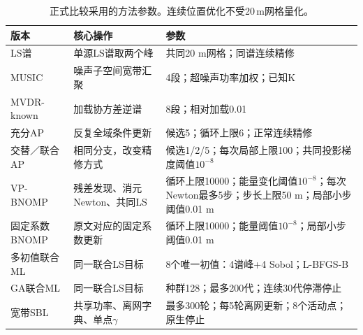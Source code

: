 \begin{table}[H]\centering\footnotesize
\caption{正式比较采用的方法参数。连续位置优化不受20\,m网格量化。}\label{tab:parameters}
\begin{tabularx}{\linewidth}{@{}p{.18\linewidth}p{.27\linewidth}X@{}}\toprule
版本 & 核心操作 & 参数\\\midrule
LS谱 & 单源LS谱取两个峰 & 共同20 m网格；同谱连续精修\\
MUSIC & 噪声子空间宽带汇聚 & 4段；超噪声功率加权；已知K\\
MVDR-known & 加载协方差逆谱 & 8段；相对加载0.01\\
充分AP & 反复全域条件更新 & 候选5；循环上限6；正常连续精修\\
交替／联合AP & 相同分支，改变精修方式 & 候选1/2/5；每次局部上限100；共同投影梯度阈值$10^{-8}$\\
VP-BNOMP & 残差发现、消元Newton、共同LS & 循环上限10000；能量变化阈值$10^{-8}$；每次Newton最多5步；步长上限50 m；局部小步阈值0.01 m\\
固定系数BNOMP & 原文对应的固定系数更新 & 循环上限10000；能量阈值$10^{-8}$；局部小步阈值0.01 m\\
多初值联合ML & 同一联合LS目标 & 8个唯一初值：4谱峰+4 Sobol；L-BFGS-B\\
GA联合ML & 同一联合LS目标 & 种群128；最多200代；连续30代停滞停止\\
宽带SBL & 共享功率、离网字典、单点$\gamma$ & 最多300轮；每5轮离网更新；8个活动点；原生停止\\
\bottomrule\end{tabularx}\end{table}
